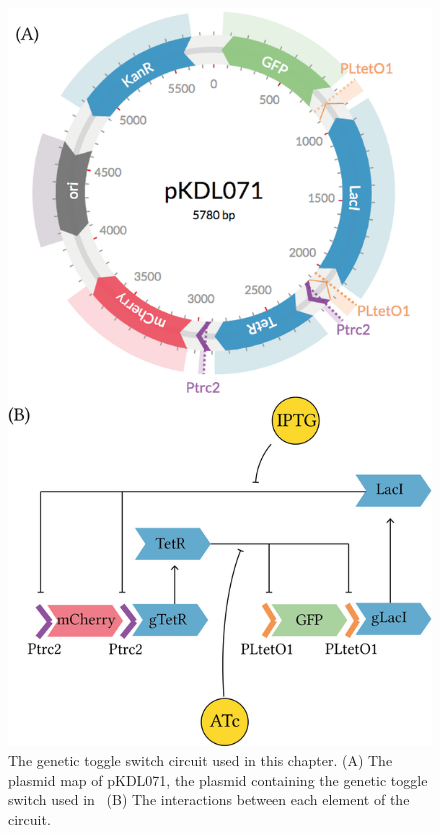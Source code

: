 \begin{figure}[tb]
	\begin{center}
		\includegraphics[scale=0.55]{../../chapters/chapterABCFlow/images/pKDL071_overview.png}
	\caption[pKDL071 plasmid map and diagram of interactions]{\label{fig:pKDL071map}The genetic toggle switch circuit used in this chapter. (A) The plasmid map of pKDL071, the plasmid containing the genetic toggle switch used in~\textcite{Litcofsky:2012gr} (B) The interactions between each element of the circuit.}
	\end{center}
\end{figure}
\clearpage


